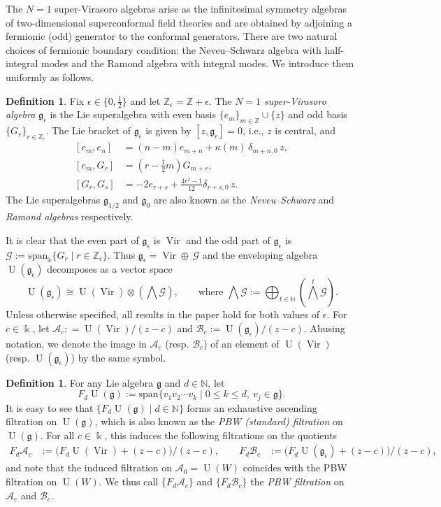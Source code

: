 \documentclass[12pt]{amsart}
\theoremstyle{plain}
\theoremstyle{definition}
\newtheorem{definition}[theorem]{Definition}
\numberwithin{equation}{theorem}
\newcommand{\kk}{\Bbbk}
\newcommand{\Vir}{\operatorname{Vir}}
\newcommand{\UU}{\operatorname{U}}
\newcommand{\NN}{\mathbb{N}}
\newcommand{\ZZ}{\mathbb{Z}}
\newcommand{\mc}[1]{\mathcal{#1}}
\newcommand{\calA}{\mathcal A}
\newcommand{\calB}{\mathcal B}
\newcommand{\g}{\mathfrak{g}}
\newcommand{\geps}{\mathfrak{g}_\epsilon}
\newcommand{\Span}{\mathrm{span}}
\begin{document}
The $N=1$ super-Virasoro algebras arise as the infinitesimal symmetry algebras of two-dimensional superconformal field theories and are obtained by adjoining a fermionic (odd) generator to the conformal generators. There are two natural choices of fermionic boundary condition: the Neveu–Schwarz algebra with half-integral modes and the Ramond algebra with integral modes. We introduce them uniformly as follows.
\begin{definition}
    Fix $\epsilon \in \{0, \frac{1}{2}\}$ and let $\ZZ_\epsilon = \ZZ + \epsilon$. The \emph{$N=1$ super-Virasoro algebra} $\geps$ is the Lie superalgebra with even basis $\{e_m\}_{m\in \ZZ} \cup\{z\}$ and odd basis $\{G_r\}_{r \in \ZZ_\epsilon}$. The Lie bracket of $\geps$ is given by $[z, \geps] = 0$, i.e., $z$ is central, and 
    \begin{equation}\label{svir-bracket}
    \begin{aligned}
        [e_m, e_n] &= (n-m)e_{m+n}+ \kappa(m) \, \delta_{m+n,0} \, z, \\
        [e_m, G_r] &= \left(r-\frac{1}{2}m\right)G_{m+r}, \\ 
        [G_r,G_s] &=-2e_{r+s}+ \frac{4r^2 - 1}{12} \delta_{r+s,0} \, z.
    \end{aligned}
    \end{equation}
    The Lie superalgebras $\mathfrak{g}_{1/2}$ and $\mathfrak{g}_0$ are also known as the \emph{Neveu--Schwarz} and \emph{Ramond algebras} respectively. 
\end{definition}
It is clear that the even part of $\geps$ is $\Vir$ and the odd part of $\geps$ is $\mathcal{G}:=\Span_{\kk}\{G_r\mid r\in \ZZ_\epsilon\}$. Thus $\geps = \Vir \oplus \, \mc{G}$ and the enveloping algebra $\UU(\geps)$ decomposes as a vector space
\[\UU(\geps)\cong\UU(\Vir)\otimes (\bigwedge \mathcal{G}), \qquad \text{where } \bigwedge \mathcal{G}:=\bigoplus_{t\in\NN}(\bigwedge ^t\mathcal{G}).\]
Unless otherwise specified, all results in the paper hold for both values of $\epsilon$. For $c \in \kk$, let $\calA_c : = \UU(\Vir)/(z-c)$ and $\calB_c:=\UU(\geps)/(z-c)$. Abusing notation, we denote the image in $\calA_c$ (resp. $\calB_c$) of an element of $\UU(\Vir)$ (resp. $\UU(\geps)$) by the same symbol. 
\begin{definition}\label{def:pbw-filtration}
For any Lie algebra $\mathfrak{g}$ and $d\in\NN$, let
\[
 F_d \UU(\g):=\Span \bigl\{v_1 v_2 \cdots v_k
 \mid 0 \le k \le d,\ v_j \in \g \bigr\}.
\]
It is easy to see that $\{F_d \UU(\g) \mid d \in \NN\}$ forms an exhaustive ascending filtration on $\UU(\g)$, which is also known as the \emph{PBW (standard) filtration} on $\UU(\g)$. For all $c \in \kk$, this induces the following filtrations on the quotients
\begin{align*}
    F_d \calA_c &:= \bigl (F_d \UU(\Vir) + (z-c) \bigr) \big/ (z-c), \qquad 
    F_d \calB_c &:= \bigl (F_d \UU(\geps) + (z-c) \bigr) \big/ (z-c),
\end{align*}
and note that the induced filtration on $\calA_0 = \UU(W)$ coincides with the PBW filtration on $\UU(W)$. We thus call $\{F_d \calA_c\}$ and $\{F_d \calB_c\}$ the \emph{PBW filtration} on $\calA_c$ and $\calB_c$. 
\end{definition}
\end{document}

